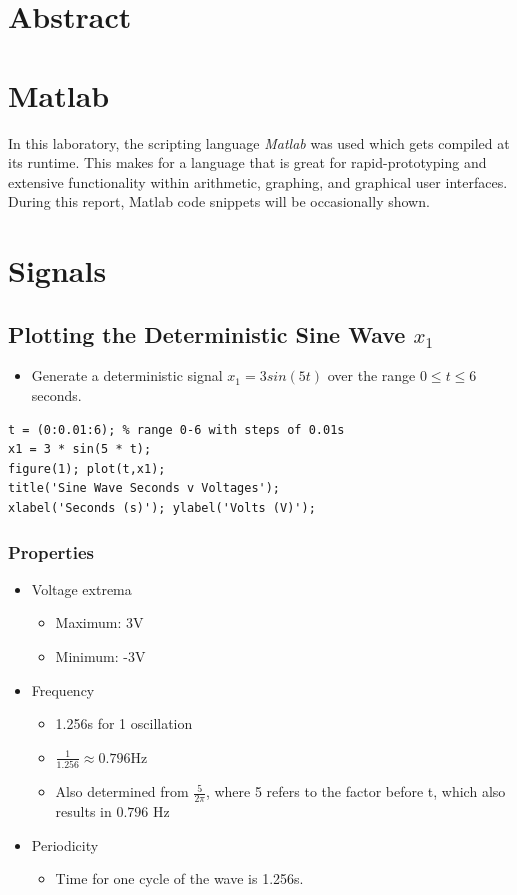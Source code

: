 \documentclass[12pt]{article}
\begin{document}

\section{Abstract}

\section{Matlab}
In this laboratory, the scripting language \emph{Matlab} was used which gets compiled at its runtime. This makes for a language that is great for rapid-prototyping and extensive functionality within arithmetic, graphing, and graphical user interfaces. During this report, Matlab code snippets will be occasionally shown.

\section{Signals}
\subsection{Plotting the Deterministic Sine Wave $x_1$}
\begin{itemize}
\item Generate a deterministic signal $x_1=3sin(5t)$ over the range $0 \leq t \leq 6$ seconds.
\end{itemize}

\begin{lstlisting}
t = (0:0.01:6); % range 0-6 with steps of 0.01s
x1 = 3 * sin(5 * t);
figure(1); plot(t,x1);
title('Sine Wave Seconds v Voltages');
xlabel('Seconds (s)'); ylabel('Volts (V)');
\end{lstlisting}

\subsubsection{Properties}
\begin{itemize}
\item Voltage extrema
\begin{itemize}
\item Maximum: 3V
\item Minimum: -3V
\end{itemize}
\item Frequency
\begin{itemize}
\item 1.256s for 1 oscillation
\item $\frac{1}{1.256} \approx 0.796$Hz
\item Also determined from $\frac{5}{2\pi}$, where 5 refers to the factor before t, which also results in $0.796$ Hz
\end{itemize}
\item Periodicity
\begin{itemize}
\item Time for one cycle of the wave is 1.256s.
\end{itemize}
\end{itemize}
\end{document}

